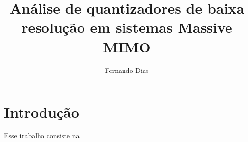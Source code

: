 \documentclass{article}
\title{Análise de quantizadores de baixa resolução em sistemas Massive MIMO}
\author{Fernando Dias}
\date{}
\begin{document}
	\maketitle
	
	\section{Introdução}
	Esse trabalho consiste na 
\end{document}
